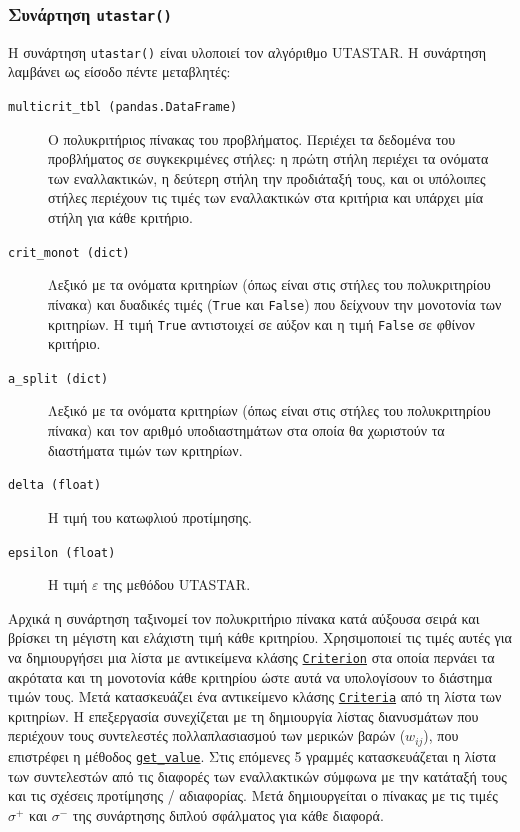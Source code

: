 \documentclass[11pt,a4paper,titlepage]{article}
\numberwithin{equation}{section}
\begin{document}
\subsubsection{Συνάρτηση \texttt{utastar()}}
\label{sssec:utastar()}
H συνάρτηση \texttt{utastar()} είναι υλοποιεί τον αλγόριθμο UTASTAR. H συνάρτηση λαμβάνει ως είσοδο πέντε μεταβλητές:
\begin{description}
    \item[\texttt{multicrit\_tbl (pandas.DataFrame)}]  
    Ο πολυκριτήριος πίνακας του προβλήματος. Περιέχει τα δεδομένα του προβλήματος σε συγκεκριμένες στήλες: η πρώτη στήλη περιέχει τα ονόματα των εναλλακτικών, η δεύτερη στήλη την προδιάταξή τους, και οι υπόλοιπες στήλες περιέχουν τις τιμές των εναλλακτικών στα κριτήρια και υπάρχει μία στήλη για κάθε κριτήριο.
    \item[\texttt{crit\_monot (dict)}]
    Λεξικό με τα ονόματα κριτηρίων (όπως είναι στις στήλες του πολυκριτηρίου πίνακα) και δυαδικές τιμές (\texttt{True} και \texttt{False}) που δείχνουν την μονοτονία των κριτηρίων. Η τιμή \texttt{True} αντιστοιχεί σε αύξον και η τιμή \texttt{False} σε φθίνον κριτήριο.
    \item[\texttt{a\_split (dict)}]
    Λεξικό με τα ονόματα κριτηρίων (όπως είναι στις στήλες του πολυκριτηρίου πίνακα) και τον αριθμό υποδιαστημάτων στα οποία θα χωριστούν τα διαστήματα τιμών των κριτηρίων.
    \item[\texttt{delta (float)}]
    Η τιμή του κατωφλιού προτίμησης.
    \item[\texttt{epsilon (float)}]
    Η τιμή $ \varepsilon $ της μεθόδου UTASTAR.
\end{description}

Αρχικά η συνάρτηση ταξινομεί τον πολυκριτήριο πίνακα κατά αύξουσα σειρά και βρίσκει τη μέγιστη και ελάχιστη τιμή κάθε κριτηρίου. Χρησιμοποιεί τις τιμές αυτές για να δημιουργήσει μια λίστα με αντικείμενα κλάσης
\hyperref[sssec:Criterion]{\texttt{Criterion}} στα οποία περνάει τα ακρότατα και τη μονοτονία κάθε κριτηρίου ώστε αυτά να υπολογίσουν το διάστημα τιμών τους. Μετά κατασκευάζει ένα αντικείμενο κλάσης \hyperref[sssec:Criteria]{\texttt{Criteria}} από τη λίστα των κριτηρίων. 
Η επεξεργασία συνεχίζεται με τη δημιουργία λίστας διανυσμάτων που περιέχουν τους συντελεστές πολλαπλασιασμού των μερικών βαρών ($ w_{ij} $), που επιστρέφει η μέθοδος \hyperlink{method:getvalue}{\texttt{get\_value}}. Στις επόμενες 5 γραμμές κατασκευάζεται η λίστα των συντελεστών από τις διαφορές των εναλλακτικών σύμφωνα με την κατάταξή τους και τις σχέσεις προτίμησης / αδιαφορίας. Μετά δημιουργείται ο πίνακας με τις τιμές $ σ^{+} $ και $ σ^{-} $ της συνάρτησης διπλού σφάλματος για κάθε διαφορά.
 
\end{document}
